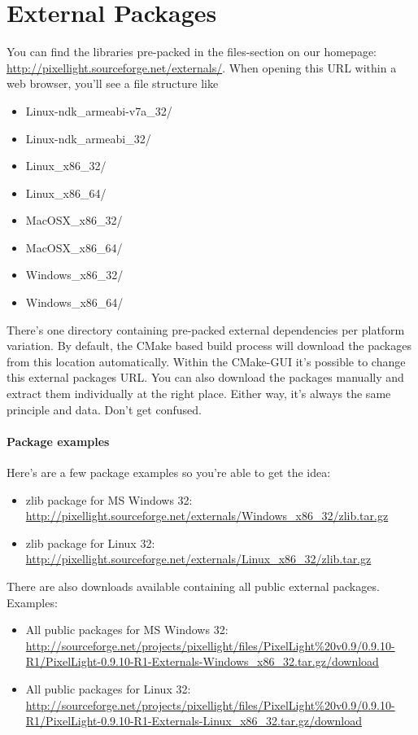 \section{External Packages}
You can find the libraries pre-packed in the files-section on our homepage: \url{http://pixellight.sourceforge.net/externals/}. When opening this \ac{URL} within a web browser, you'll see a file structure like
\begin{itemize}
\item{Linux-ndk\_armeabi-v7a\_32/}
\item{Linux-ndk\_armeabi\_32/}
\item{Linux\_x86\_32/}
\item{Linux\_x86\_64/}
\item{MacOSX\_x86\_32/}
\item{MacOSX\_x86\_64/}
\item{Windows\_x86\_32/}
\item{Windows\_x86\_64/}
\end{itemize}
There's one directory containing pre-packed external dependencies per platform variation. By default, the CMake based build process will download the packages from this location automatically. Within the CMake-GUI it's possible to change this external packages \ac{URL}. You can also download the packages manually and extract them individually at the right place. Either way, it's always the same principle and data. Don't get confused.


\paragraph{Package examples}
Here's are a few package examples so you're able to get the idea:
\begin{itemize}
\item{zlib package for \ac{MS} Windows \SI{32}{\bit}: \url{http://pixellight.sourceforge.net/externals/Windows_x86_32/zlib.tar.gz}}
\item{zlib package for Linux \SI{32}{\bit}: \url{http://pixellight.sourceforge.net/externals/Linux_x86_32/zlib.tar.gz}}
\end{itemize}

There are also downloads available containing all public external packages. Examples:
\begin{itemize}
\item{All public packages for \ac{MS} Windows \SI{32}{\bit}: \url{http://sourceforge.net/projects/pixellight/files/PixelLight%20v0.9/0.9.10-R1/PixelLight-0.9.10-R1-Externals-Windows_x86_32.tar.gz/download}}
\item{All public packages for Linux \SI{32}{\bit}: \url{http://sourceforge.net/projects/pixellight/files/PixelLight%20v0.9/0.9.10-R1/PixelLight-0.9.10-R1-Externals-Linux_x86_32.tar.gz/download}}
\end{itemize}


